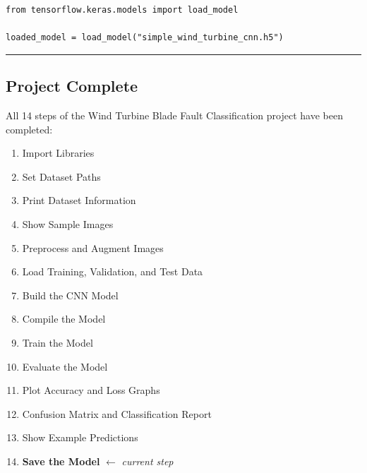 \documentclass[12pt]{article}
\begin{document}
\begin{lstlisting}[style=pythonstyle]
from tensorflow.keras.models import load_model

loaded_model = load_model("simple_wind_turbine_cnn.h5")
\end{lstlisting}

\vspace{1em}
\hrule
\vspace{1em}

\subsection*{Project Complete}

All 14 steps of the Wind Turbine Blade Fault Classification project have been completed:

\begin{enumerate}
    \item Import Libraries
    \item Set Dataset Paths
    \item Print Dataset Information
    \item Show Sample Images
    \item Preprocess and Augment Images
    \item Load Training, Validation, and Test Data
    \item Build the CNN Model
    \item Compile the Model
    \item Train the Model
    \item Evaluate the Model
    \item Plot Accuracy and Loss Graphs
    \item Confusion Matrix and Classification Report
    \item Show Example Predictions
    \item \textbf{Save the Model} $\leftarrow$ \textit{current step}
\end{enumerate}
\end{document}
